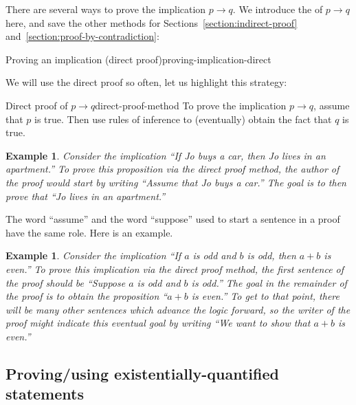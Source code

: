 \documentclass{book}
\newcounter{ekcounter}%
\theoremstyle{ekimcustom}
\newtheorem{example}[ekcounter]{Example}
\newcommand\defn[1]{{\color{blue}{\bf #1}}}
\begin{document}
There are several ways to prove the implication $p \rightarrow q$. We introduce the \defn{direct proof} of $p \rightarrow q$ here, and save the other methods for Sections~\ref{section:indirect-proof} and~\ref{section:proof-by-contradiction}:
\begin{bmethod}{Proving an implication (direct proof)}{proving-implication-direct}
\begin{center}
\end{center}
\end{bmethod}
We will use the direct proof so often, let us highlight this strategy:
\begin{bmethod}{Direct proof of $p \rightarrow q$}{direct-proof-method}
To prove the implication $p \rightarrow q$, assume that $p$ is true. Then use rules of inference to (eventually) obtain the fact that $q$ is true.
\end{bmethod}
\begin{example}
Consider the implication ``If Jo buys a car, then Jo lives in an apartment.'' To prove this proposition via the direct proof method, the author of the proof would start by writing ``Assume that Jo buys a car.'' The goal is to then prove that ``Jo lives in an apartment.''
\end{example}
The word ``assume'' and the word ``suppose'' used to start a sentence in a proof have the same role. Here is an example.
\begin{example}\label{example:aoddandbodd-implies-aplusbeven-directproof}
Consider the implication ``If $a$ is odd and $b$ is odd, then $a+b$ is even.'' To prove this implication via the direct proof method, the first sentence of the proof should be ``Suppose $a$ is odd and $b$ is odd.'' The goal in the remainder of the proof is to obtain the proposition ``$a+b$ is even.'' To get to that point, there will be many other sentences which advance the logic forward, so the writer of the proof might indicate this eventual goal by writing ``We want to show that $a+b$ is even.''
\end{example}

\subsection{Proving/using existentially-quantified statements}\label{section:proving-using-existential}
\end{document}
